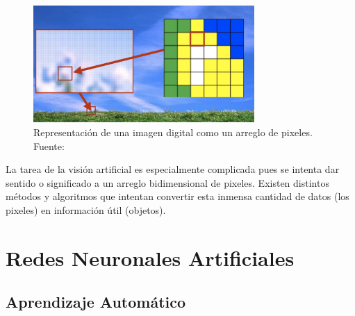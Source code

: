     \begin{figure}[!h] 
        \centering
        \includegraphics[width=0.75\textwidth]{img/digitalimg}
        \caption[Representación de una imagen digital]{Representación de una imagen digital como un arreglo de pixeles. Fuente: \cite{Szeliski2011} }
        \label{fig:digitalimg}
    \end{figure}

    La tarea de la visión artificial es especialmente complicada pues se intenta dar sentido o significado a un arreglo bidimensional 
    de pixeles. Existen distintos métodos y algoritmos que intentan convertir esta inmensa cantidad de datos (los pixeles) en 
    información útil (objetos).

\section{Redes Neuronales Artificiales}         %

    \subsection{Aprendizaje Automático}

